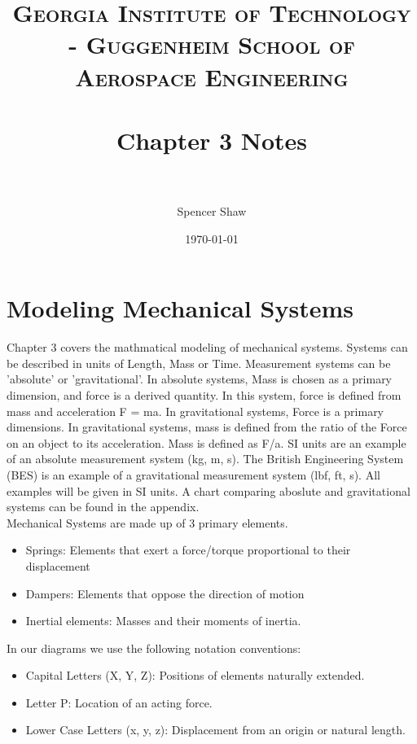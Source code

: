 \documentclass[paper=a4, fontsize=11pt]{scrartcl} %
\title{	
\normalfont \normalsize 
\textsc{Georgia Institute of Technology - Guggenheim School of Aerospace Engineering} \\ [25pt] %
\horrule{0.5pt} \\[0.4cm] %
\huge Chapter 3 Notes \\ %
\horrule{2pt} \\[0.5cm] %
}
\author{Spencer Shaw} %
\date{\normalsize\today} %
\numberwithin{equation}{section} %
\numberwithin{figure}{section} %
\numberwithin{table}{section} %
\begin{document}
\maketitle %


\section{Modeling Mechanical Systems}

Chapter 3 covers the mathmatical modeling of mechanical systems.  Systems can be described in units of Length, Mass or Time. Measurement systems can be 'absolute' or 'gravitational'. In absolute systems, Mass is chosen as a primary dimension, and force is a derived quantity. In this system, force is defined from mass and acceleration F = ma. In gravitational systems, Force is a primary dimensions. In gravitational systems, mass is defined from the ratio of the Force on an object to its acceleration. Mass is defined as F/a. SI units are an example of an absolute measurement system (kg, m, s). The British Engineering System (BES) is an example of a gravitational measurement system (lbf, ft, s). All examples will be given in SI units. A chart comparing aboslute and gravitational systems can be found in the appendix.\\

Mechanical Systems are made up of 3 primary elements. 
\begin{itemize}
\setlength\itemsep{0em}
\item Springs: Elements that exert a force/torque proportional to their displacement
\item Dampers: Elements that oppose the direction of motion 
\item Inertial elements: Masses and their moments of inertia. \\
\end{itemize} 

In our diagrams we use the following notation conventions: 
\begin{itemize}
\setlength\itemsep{0em}
\item Capital Letters (X, Y, Z): Positions of elements naturally extended.
\item Letter P: Location of an acting force.
\item Lower Case Letters (x, y, z): Displacement from an origin or natural length.\\
\end{itemize}
\end{document}

